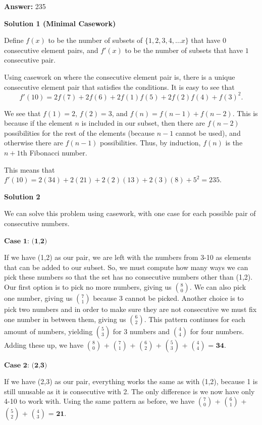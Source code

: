 \begin{enumerate}
{{ \textbf{Answer: }235



\textbf{Solution 1 (Minimal Casework)}

Define $f(x)$ to be the number of subsets of $\{1, 2, 3, 4, \ldots x\}$ that have $0$ consecutive element pairs, and $f'(x)$ to be the number of subsets that have $1$ consecutive pair.

 Using casework on where the consecutive element pair is, there is a unique consecutive element pair that satisfies the conditions. It is easy to see that 
 \[f'(10) = 2f(7) + 2f(6) + 2f(1)f(5) + 2f(2)f(4) + f(3)^2.\]

 We see that $f(1) = 2$, $f(2) = 3$, and $f(n) = f(n-1) + f(n-2)$. This is because if the element $n$ is included in our subset, then there are $f(n-2)$ possibilities for the rest of the elements (because $n-1$ cannot be used), and otherwise there are $f(n-1)$ possibilities. Thus, by induction, $f(n)$ is the $n+1$th Fibonacci number.

 This means that $f'(10) = 2(34) + 2(21) + 2(2)(13) + 2(3)(8) + 5^2 = \boxed{235}$.

 



\textbf{Solution 2}

We can solve this problem using casework, with one case for each possible pair of consecutive numbers.

 $\textbf{Case 1: (1,2)}$

 If we have (1,2) as our pair, we are left with the numbers from 3-10 as elements that can be added to our subset. So, we must compute how many ways we can pick these numbers so that the set has no consecutive numbers other than (1,2). Our first option is to pick no more numbers, giving us $8 \choose {0}$. We can also pick one number, giving us $7 \choose {1}$ because 3 cannot be picked. Another choice is to pick two numbers and in order to make sure they are not consecutive we must fix one number in between them, giving us $6 \choose {2}$. This pattern continues for each amount of numbers, yielding $5 \choose {3}$ for 3 numbers and $4 \choose {4}$ for four numbers. Adding these up, we have $8 \choose {0}$ + $7 \choose {1}$ + $6 \choose {2}$ + $5 \choose {3}$ + $4 \choose {4}$ = $\textbf{34}$.

 


 $\textbf{Case 2: (2,3)}$

 If we have (2,3) as our pair, everything works the same as with (1,2), because 1 is still unusable as it is consecutive with 2. The only difference is we now have only 4-10 to work with. Using the same pattern as before, we have $7 \choose {0}$ + $6 \choose {1}$ + $5 \choose {2}$ + $4 \choose {3}$ = $\textbf{21}$.

}}
\end{enumerate}
